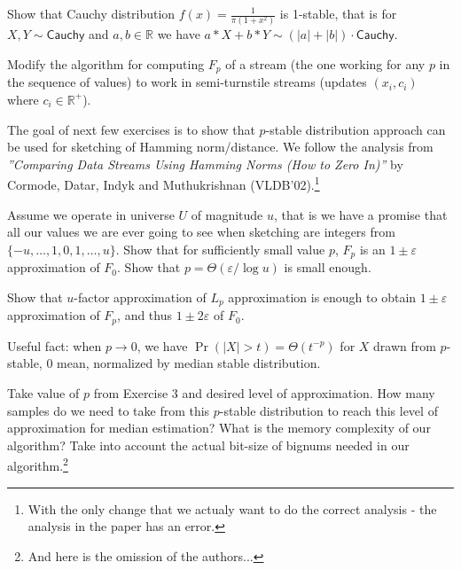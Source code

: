 \documentclass[12pt]{uebung}
\begin{document}
 


\renewcommand{\aufgname}{Exercise}
\begin{aufg}
Show that Cauchy distribution $f(x) = \frac{1}{\pi(1+x^2)}$ is 1-stable, that is for $X,Y \sim \textsf{Cauchy}$ and $a,b \in \mathbb{R}$ we have $a*X+b*Y \sim (|a|+|b|) \cdot \textsf{Cauchy}$.
\end{aufg}

\begin{aufg}
Modify the algorithm for computing $F_p$ of a stream (the one working for any $p$ in the sequence of values) to work in semi-turnstile streams (updates $(x_i,c_i)$ where $c_i \in \mathbb{R}^+$).
\end{aufg}

\bigskip
\bigskip

The goal of next few exercises is to show that $p$-stable distribution approach can be used for sketching of Hamming norm/distance. We follow the analysis from \emph{''Comparing Data Streams Using Hamming Norms
(How to Zero In)''} by Cormode, Datar, Indyk and Muthukrishnan (VLDB'02).\footnote{With the only change that we actualy want to do the correct analysis - the analysis in the paper has an error.}

\begin{aufg}
Assume we operate in universe $U$ of magnitude $u$, that is we have a promise that all our values we are ever going to see when sketching are integers from $\{-u,\ldots,1,0,1,\ldots,u\}$. Show that for sufficiently small value $p$, $F_p$ is an $1 \pm \varepsilon$ approximation of $F_0$. Show that $p= \Theta(\varepsilon/\log u)$ is small enough.

Show that $u$-factor approximation of $L_p$ approximation is enough to obtain $1 \pm \varepsilon$ approximation of $F_p$, and thus $1 \pm 2\varepsilon$ of $F_0$.
\end{aufg}

\bigskip
\bigskip


Useful fact: when $p \to 0$, we have $\Pr( |X| > t) = \Theta(t^{-p})$ for $X$ drawn from $p$-stable, 0 mean, normalized by median stable distribution.

\begin{aufg}[2 pts]
Take value of $p$ from Exercise 3 and desired level of approximation. How many samples do we need to take from this $p$-stable distribution to reach this level of approximation for median estimation?
What is the memory complexity of our algorithm? Take into account the actual bit-size of bignums needed in our algorithm.\footnote{And here is the omission of the authors...}
\end{aufg}
\end{document}
